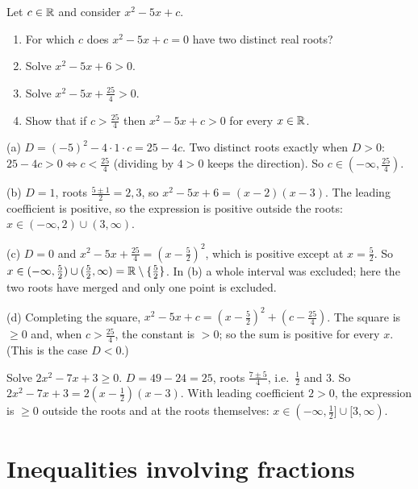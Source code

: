 \begin{example}
Let $c\in\mathbb{R}$ and consider $x^2-5x+c$. 
\begin{enumerate}
  \item For which $c$ does $x^2-5x+c=0$ have two distinct real roots?
  \item Solve $x^2-5x+6>0$.
  \item Solve $x^2-5x+\tfrac{25}4>0$.
  \item Show that if $c>\tfrac{25}{4}$ then $x^2-5x+c>0$ for every $x\in\mathbb{R}$.
\end{enumerate}
\solution
(a) $D=(-5)^2-4\cdot1\cdot c=25-4c$. Two distinct roots exactly when $D>0$: $25-4c>0\Leftrightarrow c<\tfrac{25}4$
(dividing by $4>0$ keeps the direction). So $c\in(-\infty,\tfrac{25}4)$.

(b) $D=1$, roots $\frac{5\pm1}2=2,3$, so $x^2-5x+6=(x-2)(x-3)$. The leading coefficient is positive, so the
expression is positive outside the roots: $x\in(-\infty,2)\cup(3,\infty)$.

(c) $D=0$ and $x^2-5x+\tfrac{25}4=(x-\tfrac52)^2$, which is positive except at $x=\tfrac52$. So
$x\in(-\infty,\tfrac52)\cup(\tfrac52,\infty)=\mathbb{R}\setminus\{\tfrac52\}$. In (b) a whole interval was excluded; here
the two roots have merged and only one point is excluded.

(d) Completing the square, $x^2-5x+c=(x-\tfrac52)^2+(c-\tfrac{25}4)$. The square is $\ge0$ and, when
$c>\tfrac{25}4$, the constant is $>0$; so the sum is positive for every $x$. (This is the case $D<0$.)
\end{example}

\begin{example}
Solve $2x^2-7x+3\ge0$.
\solution
$D=49-24=25$, roots $\frac{7\pm5}{4}$, i.e.\ $\tfrac12$ and $3$. So $2x^2-7x+3=2(x-\tfrac12)(x-3)$. With leading
coefficient $2>0$, the expression is $\ge0$ outside the roots and at the roots themselves:
$x\in(-\infty,\tfrac12]\cup[3,\infty)$.
\end{example}

\section{Inequalities involving fractions}\label{sec:fraction-ineq}

